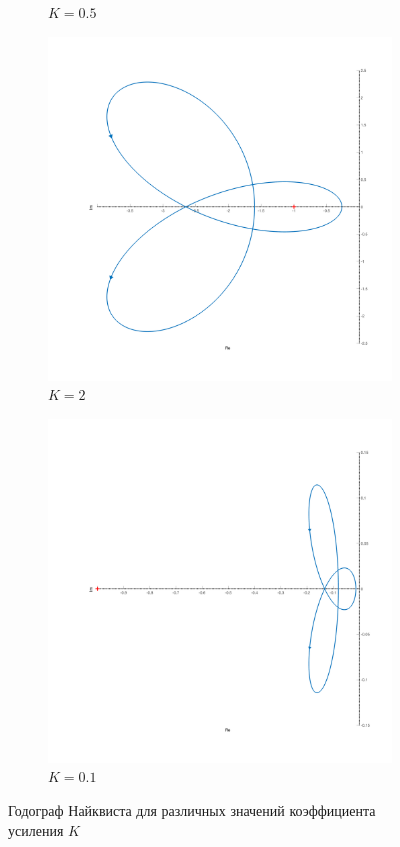 \begin{figure}[ht!]
\begin{subfigure}{0.5\textwidth}
        \caption{$K = 0.5$}
    \end{subfigure}
    \begin{subfigure}{0.5\textwidth}
        \centering
        \includegraphics[width=\textwidth]{media/plots/task5_nyquist_3.png}
        \caption{$K = 2$}
    \end{subfigure}
    \begin{subfigure}{0.5\textwidth}
        \centering
        \includegraphics[width=\textwidth]{media/plots/task5_nyquist_4.png}
        \caption{$K = 0.1$}
    \end{subfigure}
    \caption{Годограф Найквиста для различных значений коэффициента усиления $K$}
    \label{fig:task5_nyquist}
\end{figure}

